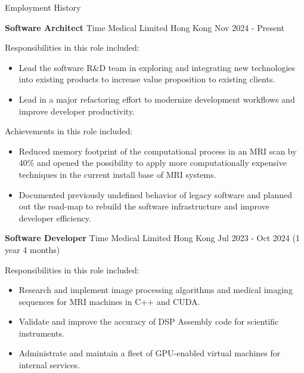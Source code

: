 \documentclass{resume} %
\begin{document}

\begin{rSection}{Employment History}
    \vspace{-1.25em}
    \item \textbf{Software Architect} {Time Medical Limited Hong Kong}
    \hfill Nov 2024 - Present\\
    
    \hspace*{1cm}%
    \begin{minipage}{.8\textwidth}%
        Responsibilities in this role included:
        \begin{itemize}
            \item Lead the software R\&D team in exploring and integrating new technologies into existing products to increase value proposition to existing clients.
            \item Lead in a major refactoring effort to modernize development workflows and improve developer productivity.
        \end{itemize}
        
        Achievements in this role included:
        \begin{itemize}
            \item Reduced memory footprint of the computational process in an MRI scan by 40\% and opened the possibility to apply more computationally expensive techniques in the current install base of MRI systems.
            \item Documented previously undefined behavior of legacy software and planned out the road-map to rebuild the software infrastructure and improve developer efficiency.
        \end{itemize}
    \end{minipage}%
    
    \item \textbf{Software Developer} {Time Medical Limited Hong Kong}
    \hfill Jul 2023 - Oct 2024 (1 year 4 months)\\
    
    \hspace*{1cm}%
    \begin{minipage}{.8\textwidth}%
        Responsibilities in this role included:
        \begin{itemize}
            \item Research and implement image processing algorithms and medical imaging sequences for MRI machines in C++ and CUDA.
            \item Validate and improve the accuracy of DSP Assembly code for scientific instruments.
            \item Administrate and maintain a fleet of GPU-enabled virtual machines for internal services.
        \end{itemize}


\end{minipage}
\end{rSection}
\end{document}
